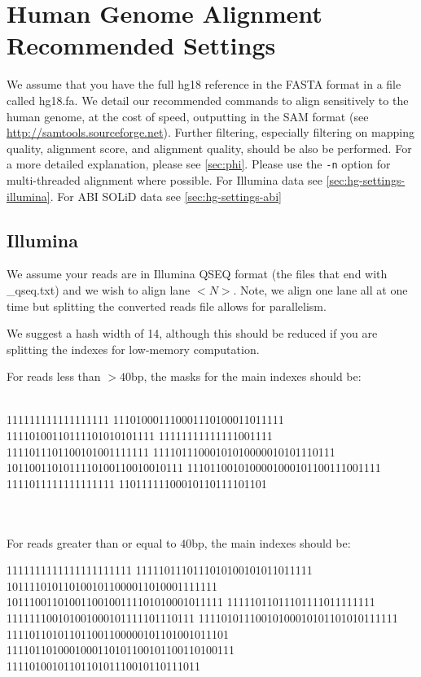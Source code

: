 \documentclass[a4paper,12pt]{book}
\begin{document}
\section{Human Genome Alignment Recommended Settings}
\label{sec:hg-settings}
We assume that you have the full hg18 reference in the FASTA format in a file called hg18.fa.
We detail our recommended commands to align sensitively to the human genome, at the cost of speed, outputting in the SAM format (see \url{http://samtools.sourceforge.net}).
Further filtering, especially filtering on mapping quality, alignment score, and alignment quality, should be also be performed.
For a more detailed explanation, please see \autoref{sec:phi}.
Please use the {\tt -n} option for multi-threaded alignment where possible.
For Illumina data see \autoref{sec:hg-settings-illumina}. 
For ABI SOLiD data see \autoref{sec:hg-settings-abi}

\subsection{Illumina}
\label{sec:hg-settings-illumina}
We assume your reads are in Illumina QSEQ format (the files that end with \_qseq.txt) and we wish to align lane $<N>$.
Note, we align one lane all at one time but splitting the converted reads file allows for parallelism.

We suggest a hash width of 14, although this should be reduced if you are splitting the indexes for low-memory computation.

For reads less than $>40$bp, the masks for the main indexes should be:\\
\\
\begin{boxedverbatim}
111111111111111111
111010001110001110100011011111
11110100110111101010101111
11111111111111001111
1111011101100101001111111
11110111000101010000010101110111
1011001101011110100110010010111
1110110010100001000101100111001111
1111011111111111111
11011111100010110111101101
\end{boxedverbatim}
\\
\\
For reads greater than or equal to $40$bp, the main indexes should be:\\
\begin{boxedverbatim}
1111111111111111111111
1111101110111010100101011011111
1011110101101001011000011010001111111
10111001101001100100111101010001011111
11111011011101111011111111
111111100101001000101111101110111
11110101110010100010101101010111111
111101101011011001100000101101001011101
1111011010001000110101100101100110100111
1111010010110110101110010110111011
\end{boxedverbatim}
\\
\end{document}
